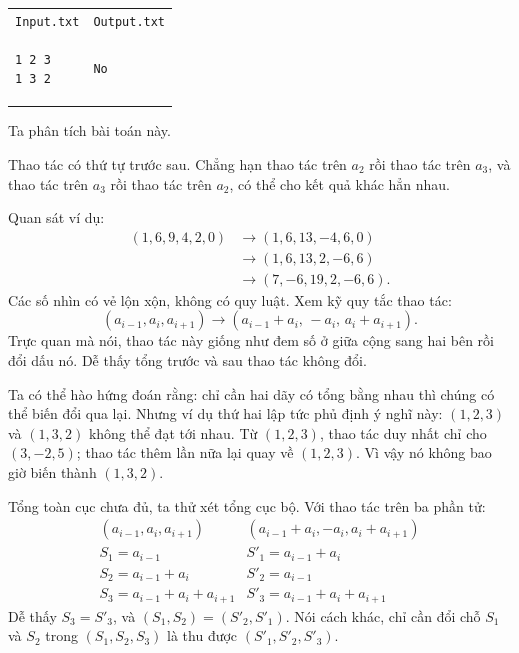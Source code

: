 \documentclass[11pt]{article}
\begin{document}
\begin{center}
\begin{tabular}{ll}
\texttt{Input.txt} & \texttt{Output.txt}\\
\begin{minipage}{0.35\linewidth}
\begin{verbatim}
1 2 3
1 3 2
\end{verbatim}
\end{minipage}
&
\begin{minipage}{0.25\linewidth}
\begin{verbatim}
No
\end{verbatim}
\end{minipage}
\end{tabular}
\end{center}

Ta phân tích bài toán này.

Thao tác có thứ tự trước sau. Chẳng hạn thao tác trên \(a_2\) rồi thao tác
trên \(a_3\), và thao tác trên \(a_3\) rồi thao tác trên \(a_2\), có thể cho
kết quả khác hẳn nhau.

Quan sát ví dụ:
\[
\begin{aligned}
(1,6,9,4,2,0)&\to(1,6,13,-4,6,0)\\
&\to(1,6,13,2,-6,6)\\
&\to(7,-6,19,2,-6,6).
\end{aligned}
\]
Các số nhìn có vẻ lộn xộn, không có quy luật. Xem kỹ quy tắc thao tác:
\[
  (a_{i-1},a_i,a_{i+1})
  \to
  (a_{i-1}+a_i,\,-a_i,\,a_i+a_{i+1}).
\]
Trực quan mà nói, thao tác này giống như đem số ở giữa cộng sang hai bên rồi
đổi dấu nó. Dễ thấy tổng trước và sau thao tác không đổi.

Ta có thể hào hứng đoán rằng: chỉ cần hai dãy có tổng bằng nhau thì chúng có
thể biến đổi qua lại. Nhưng ví dụ thứ hai lập tức phủ định ý nghĩ này:
\((1,2,3)\) và \((1,3,2)\) không thể đạt tới nhau. Từ \((1,2,3)\), thao tác
duy nhất chỉ cho \((3,-2,5)\); thao tác thêm lần nữa lại quay về
\((1,2,3)\). Vì vậy nó không bao giờ biến thành \((1,3,2)\).

Tổng toàn cục chưa đủ, ta thử xét tổng cục bộ. Với thao tác trên ba phần tử:
\[
\begin{array}{c|c}
(a_{i-1},a_i,a_{i+1}) &
(a_{i-1}+a_i,-a_i,a_i+a_{i+1})\\ \hline
S_1=a_{i-1} & S'_1=a_{i-1}+a_i\\
S_2=a_{i-1}+a_i & S'_2=a_{i-1}\\
S_3=a_{i-1}+a_i+a_{i+1} & S'_3=a_{i-1}+a_i+a_{i+1}
\end{array}
\]
Dễ thấy \(S_3=S'_3\), và \((S_1,S_2)=(S'_2,S'_1)\). Nói cách khác, chỉ cần
đổi chỗ \(S_1\) và \(S_2\) trong \((S_1,S_2,S_3)\) là thu được
\((S'_1,S'_2,S'_3)\).
\end{document}

